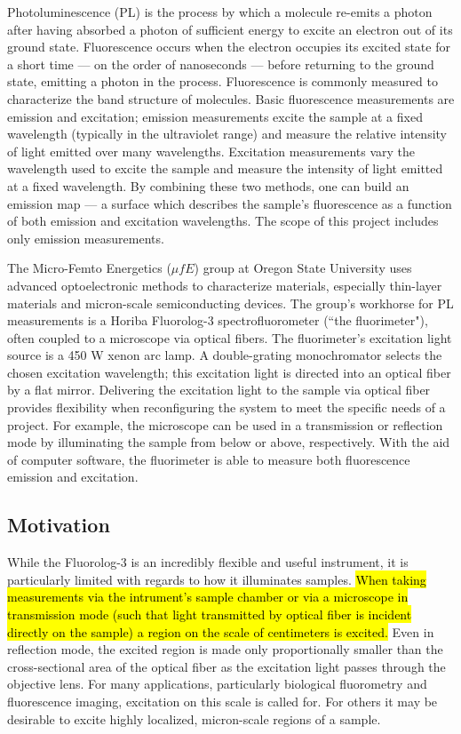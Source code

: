 Photoluminescence (PL) is the process by which a molecule re-emits a photon after having absorbed a photon of sufficient energy to excite an electron out of its ground state. Fluorescence occurs when the electron occupies its excited state for a short time  --- on the order of nanoseconds --- before returning to the ground state, emitting a photon in the process. Fluorescence is commonly measured to characterize the band structure of molecules. Basic fluorescence measurements are emission and excitation; emission measurements excite the sample at a fixed wavelength (typically in the ultraviolet range) and measure the relative intensity of light emitted over many wavelengths. Excitation measurements vary the wavelength used to excite the sample and measure the intensity of light emitted at a fixed wavelength. By combining these two methods, one can build an emission map --- a surface which describes the sample's fluorescence as a function of both emission and excitation wavelengths. The scope of this project includes only emission measurements.

The Micro-Femto Energetics ($\mu fE$) group at Oregon State University uses advanced optoelectronic methods to characterize materials, especially thin-layer materials and micron-scale semiconducting devices. The group's workhorse for PL measurements is a Horiba Fluorolog-3 spectrofluorometer (``the fluorimeter"), often coupled to a microscope via optical fibers. The fluorimeter's excitation light source is a 450 W xenon arc lamp. A double-grating monochromator selects the chosen excitation wavelength; this excitation light is directed into an optical fiber by a flat mirror. Delivering the excitation light to the sample via optical fiber provides flexibility when reconfiguring the system to meet the specific needs of a project. For example, the microscope can be used in a transmission or reflection mode by illuminating the sample from below or above, respectively. With the aid of computer software, the fluorimeter is able to measure both fluorescence emission and excitation.

\subsection{Motivation}
While the Fluorolog-3 is an incredibly flexible and useful instrument, it is particularly limited with regards to how it illuminates samples. \hl{When taking measurements via the intrument's sample chamber or via a microscope in transmission mode (such that light transmitted by optical fiber is incident directly on the sample) a region on the scale of centimeters is excited.} Even in reflection mode, the excited region is made only proportionally smaller than the cross-sectional area of the optical fiber as the excitation light passes through the objective lens. For many applications, particularly biological fluorometry and fluorescence imaging, excitation on this scale is called for. For others it may be desirable to excite highly localized, micron-scale regions of a sample.

